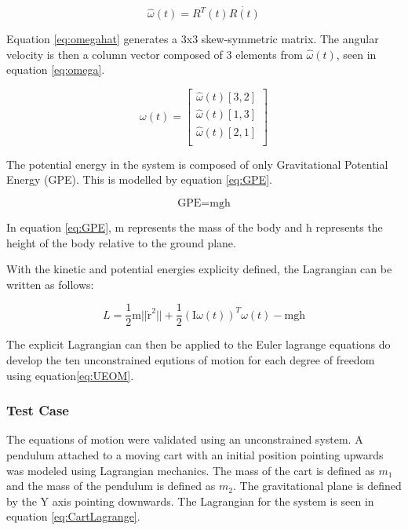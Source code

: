 \documentclass[12pt,letterpaper]{article}
\begin{document}
\begin{equation}
\label{eq:omegahat}
\hat{\omega}(t)=R^T(t)\dot{R(t)}
\end{equation}

Equation \ref{eq:omegahat} generates a 3x3 skew-symmetric matrix. The angular velocity is then a column vector composed of 3 elements from $\hat{\omega}(t)$, seen in equation \ref{eq:omega}.

\begin{equation}
\label{eq:omega}
\omega(t)=\begin{bmatrix}
\hat{\omega}(t)[3,2] \\
\hat{\omega}(t)[1,3] \\
\hat{\omega}(t)[2,1]\\
\end{bmatrix}
\end{equation}

The potential energy in the system is composed of only Gravitational Potential Energy (GPE). This is modelled by equation \ref{eq:GPE}.

\begin{equation}
\label{eq:GPE}
\text{GPE} = {\text{m}}{\text{g}}{\text{h}}
\end{equation}

In equation \ref{eq:GPE}, m represents the mass of the body and h represents the height of the body relative to the ground plane.

With the kinetic and potential energies explicity defined, the Lagrangian can be written as follows:

\begin{equation}
L= \frac{1}{2}{\text{m}}{\lvert \lvert {\dot{\text{r}}^2} \rvert \rvert} + \frac{1}{2}({\text{I}}{\omega(t)})^T\omega(t) - {\text{m}}{\text{g}}{\text{h}}
\end{equation}

The explicit Lagrangian can then be applied to the Euler lagrange equations do develop the ten unconstrained equtions of motion for each degree of freedom using equation\ref{eq:UEOM}.

\subsubsection{Test Case}
The equations of motion were validated using an unconstrained system. A pendulum  attached to a moving cart with an initial position pointing upwards was modeled using Lagrangian mechanics. 
The mass of the cart is defined as $m_{1}$ and the mass of the pendulum is defined as $m_{2}$. 
The gravitational plane is defined by the Y axis pointing downwards.
The Lagrangian for the system is seen in equation \ref{eq:CartLagrange}.
\end{document}

